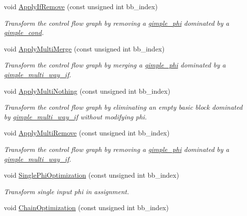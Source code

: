 \begin{DoxyCompactItemize}
void \hyperlink{classPhiOpt_a5d3aca47ec2f9f675c2f6ffbe2a5eef0}{Apply\+If\+Remove} (const unsigned int bb\+\_\+index)
\begin{DoxyCompactList}\small\item\em Transform the control flow graph by removing a \hyperlink{structgimple__phi}{gimple\+\_\+phi} dominated by a \hyperlink{structgimple__cond}{gimple\+\_\+cond}. \end{DoxyCompactList}\item 
void \hyperlink{classPhiOpt_ae4b11dc6285655c89d79ef38bb635374}{Apply\+Multi\+Merge} (const unsigned int bb\+\_\+index)
\begin{DoxyCompactList}\small\item\em Transform the control flow graph by merging a \hyperlink{structgimple__phi}{gimple\+\_\+phi} dominated by a \hyperlink{structgimple__multi__way__if}{gimple\+\_\+multi\+\_\+way\+\_\+if}. \end{DoxyCompactList}\item 
void \hyperlink{classPhiOpt_a7e227327f0aaa8d0714b5bf0ca4354ab}{Apply\+Multi\+Nothing} (const unsigned int bb\+\_\+index)
\begin{DoxyCompactList}\small\item\em Transform the control flow graph by eliminating an empty basic block dominated by \hyperlink{structgimple__multi__way__if}{gimple\+\_\+multi\+\_\+way\+\_\+if} without modifying phi. \end{DoxyCompactList}\item 
void \hyperlink{classPhiOpt_a4992671043b61c9366438a2387943f73}{Apply\+Multi\+Remove} (const unsigned int bb\+\_\+index)
\begin{DoxyCompactList}\small\item\em Transform the control flow graph by removing a \hyperlink{structgimple__phi}{gimple\+\_\+phi} dominated by a \hyperlink{structgimple__multi__way__if}{gimple\+\_\+multi\+\_\+way\+\_\+if}. \end{DoxyCompactList}\item 
void \hyperlink{classPhiOpt_a1914c66ecf01c9ae565631219c6a60ca}{Single\+Phi\+Optimization} (const unsigned int bb\+\_\+index)
\begin{DoxyCompactList}\small\item\em Transform single input phi in assignment. \end{DoxyCompactList}\item 
void \hyperlink{classPhiOpt_a128433a1cf7590534b3f9f990fb19683}{Chain\+Optimization} (const unsigned int bb\+\_\+index)

\end{DoxyCompactItemize}
